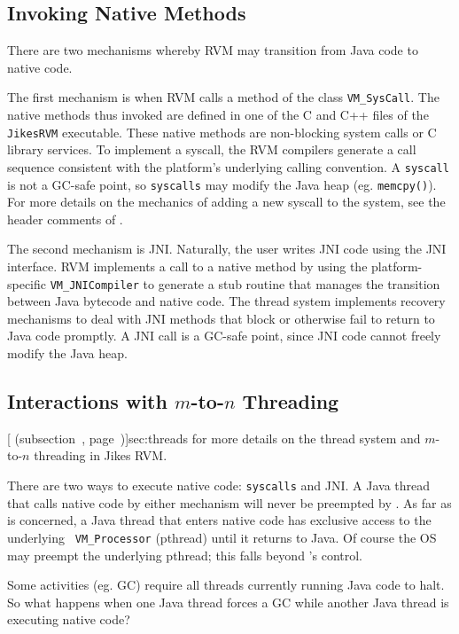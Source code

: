 \subsection{Invoking Native Methods}
There are two mechanisms whereby RVM may transition from Java code to native
code.

The first mechanism is when RVM calls a method of the class {\tt VM\_SysCall}.
The native methods thus invoked are defined in one of the
C and C++ files of the {\tt JikesRVM} executable. 
These native methods are non-blocking system calls or C library 
services.  To implement a syscall, the RVM compilers generate a call
sequence consistent with the platform's underlying calling convention.
A {\tt syscall} is not a GC-safe point, so {\tt syscalls} may modify the
Java heap (eg. {\tt memcpy()}). For more details on the mechanics of adding a
new syscall to the system, see the header comments of 
.

The second mechanism is JNI.  Naturally, the user writes JNI code
using the JNI interface.  RVM implements a call to a native method by
using the platform-specific {\tt VM\_JNICompiler} to generate a stub
routine that manages the transition between Java bytecode and native code.  The
thread system implements recovery mechanisms to deal with JNI methods
that block or otherwise fail to return to Java code promptly.  A JNI call
is a GC-safe point, since JNI code cannot freely modify the Java heap.

\subsection{Interactions with $m$-to-$n$ Threading}
[ (subsection~\Ref,
page~\Pageref)]{sec:threads} for more details on the thread system
and $m$-to-$n$ threading in Jikes RVM. 

There are two ways to execute native code: {\tt syscalls} and JNI.
A Java thread that calls native code by either mechanism will never
be preempted by \jrvm{}.  As far as \jrvm{} is concerned, a Java thread that
enters native code has exclusive access to the underlying {\tt
VM\_Processor} (pthread) until it returns to Java.  Of course the OS may preempt the underlying
pthread; this falls beyond \jrvm{}'s control.

Some activities (eg. GC) require all threads currently running Java code to halt.  
So what happens when one Java thread forces a GC while another Java thread is
executing native code?

